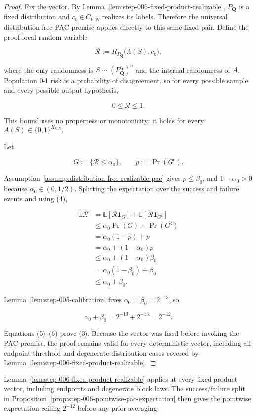\begin{proof}
Fix the vector. By
Lemma~\ref{lem:step-006-fixed-product-realizable},
\(P_{\boldsymbol Q}\) is a fixed distribution and
\(c_{\boldsymbol t}\in C_{k,N}\) realizes its labels. Therefore the
universal distribution-free PAC premise applies directly to this same
fixed pair. Define the proof-local random variable

\[
\mathcal R
:=R_{P_{\boldsymbol Q}}\bigl(A(S),c_{\boldsymbol t}\bigr),
\]

where the only randomness is
\(S\sim(P_{\boldsymbol Q}^{c_{\boldsymbol t}})^n\) and the internal
randomness of \(A\). Population 0-1 risk is a probability of disagreement,
so for every possible sample and every possible output hypothesis,

\[
0\le\mathcal R\le1.
\tag{4}
\]

This bound uses no properness or monotonicity: it holds for every
\(A(S)\in\{0,1\}^{X_{k,N}}\).

Let

\[
G:=\{\mathcal R\le\alpha_0\},
\qquad p:=\Pr(G^{\mathsf c}).
\]

Assumption~\ref{assump:distribution-free-realizable-pac} gives
\(p\le\beta_0\), and \(1-\alpha_0>0\) because
\(\alpha_0\in(0,1/2)\). Splitting the expectation over the success and
failure events and using (4),

\[
\begin{aligned}
\mathbb E\mathcal R
&=\mathbb E[\mathcal R\mathbf 1_G]
  +\mathbb E[\mathcal R\mathbf 1_{G^{\mathsf c}}]\\
&\le \alpha_0\Pr(G)+\Pr(G^{\mathsf c})\\
&=\alpha_0(1-p)+p\\
&=\alpha_0+(1-\alpha_0)p\\
&\le\alpha_0+(1-\alpha_0)\beta_0\\
&=\alpha_0(1-\beta_0)+\beta_0\\
&\le\alpha_0+\beta_0.
\end{aligned}
\tag{5}
\]

Lemma~\ref{lem:step-005-calibration} fixes
\(\alpha_0=\beta_0=2^{-13}\), so

\[
\alpha_0+\beta_0=2^{-13}+2^{-13}=2^{-12}.
\tag{6}
\]

Equations (5)--(6) prove (3). Because the vector was fixed before invoking
the PAC premise, the proof remains valid for every deterministic vector,
including all endpoint-threshold and degenerate-distribution cases covered
by Lemma~\ref{lem:step-006-fixed-product-realizable}. \end{proof}
Lemma~\ref{lem:step-006-fixed-product-realizable} applies at every fixed
product vector, including endpoints and degenerate block laws.  The
success/failure split in
Proposition~\ref{prop:step-006-pointwise-pac-expectation} then gives the
pointwise expectation ceiling $2^{-12}$ before any prior averaging.

